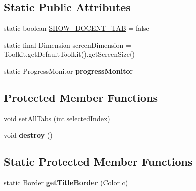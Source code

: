 \subsection*{Static Public Attributes}
\begin{DoxyCompactItemize}
\item 
static boolean \hyperlink{classgov_1_1fnal_1_1ppd_1_1dd_1_1ChannelSelector_ad9e88d31f70467252e90a59943338df0}{S\-H\-O\-W\-\_\-\-D\-O\-C\-E\-N\-T\-\_\-\-T\-A\-B} = false
\item 
static final Dimension \hyperlink{classgov_1_1fnal_1_1ppd_1_1dd_1_1ChannelSelector_a78f6040f260da659faca3b09d0617e7e}{screen\-Dimension} = Toolkit.\-get\-Default\-Toolkit().get\-Screen\-Size()
\item 
\hypertarget{classgov_1_1fnal_1_1ppd_1_1dd_1_1ChannelSelector_a000b7d7465b66bd829ae995a9494505b}{static Progress\-Monitor {\bfseries progress\-Monitor}}\label{classgov_1_1fnal_1_1ppd_1_1dd_1_1ChannelSelector_a000b7d7465b66bd829ae995a9494505b}

\end{DoxyCompactItemize}
\subsection*{Protected Member Functions}
\begin{DoxyCompactItemize}
\item 
void \hyperlink{classgov_1_1fnal_1_1ppd_1_1dd_1_1ChannelSelector_abba1a8a5599959eb2e7a905f6bfd1685}{set\-All\-Tabs} (int selected\-Index)
\item 
\hypertarget{classgov_1_1fnal_1_1ppd_1_1dd_1_1ChannelSelector_a72b3571d9e3fda6bba926fc732c583b1}{void {\bfseries destroy} ()}\label{classgov_1_1fnal_1_1ppd_1_1dd_1_1ChannelSelector_a72b3571d9e3fda6bba926fc732c583b1}

\end{DoxyCompactItemize}
\subsection*{Static Protected Member Functions}
\begin{DoxyCompactItemize}
\item 
\hypertarget{classgov_1_1fnal_1_1ppd_1_1dd_1_1ChannelSelector_a984845b48df72e93fb62ca3d36701ba4}{static Border {\bfseries get\-Title\-Border} (Color c)}\label{classgov_1_1fnal_1_1ppd_1_1dd_1_1ChannelSelector_a984845b48df72e93fb62ca3d36701ba4}

\end{DoxyCompactItemize}
